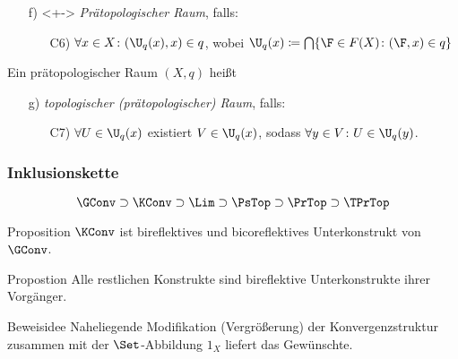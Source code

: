 \begin{frame}
\begin{enumerate}[a)]
\begin{enumerate}
      \end{enumerate}
    \item[f)]<+-> \emph{Prätopologischer Raum}, falls:
      \begin{enumerate}
        \item[C6)] $\forall x \in X \colon (\U_q(x), x) \in q$, wobei $\U_q(x) \coloneqq \bigcap\{ \F \in F(X) \colon (\F, x) \in q\}$
      \end{enumerate}
  \end{enumerate}
  \pause
  Ein prätopologischer Raum $(X,q)$ heißt 
  \begin{enumerate}[a)]
    \item[g)] \emph{topologischer (pr\"atopologischer) Raum}, falls:
      \begin{enumerate}
        \item[C7)] $\forall U \in \U_q(x)$ existiert $V \in \U_q(x)$, sodass $\forall y \in V \colon U \in \U_q(y)$.
      \end{enumerate}
  \end{enumerate}
\end{frame}

\begin{frame}
  \frametitle{Inklusionskette}
  $$
  \GConv \supset \KConv \supset \Lim \supset \PsTop \supset \PrTop \supset \TPrTop
  $$

  \begin{block}{Proposition}
    $\KConv$ ist bireflektives und bicoreflektives Unterkonstrukt von $\GConv$.
  \end{block}

  \begin{block}{Propostion}
    Alle restlichen Konstrukte sind bireflektive Unterkonstrukte ihrer Vorg\"anger.
  \end{block}

  \begin{block}{Beweisidee}
    Naheliegende Modifikation (Vergrößerung) der Konvergenzstruktur zusammen mit der $\Set$-Abbildung $1_X$ liefert das Gew\"unschte.
  \end{block}
\end{frame}

